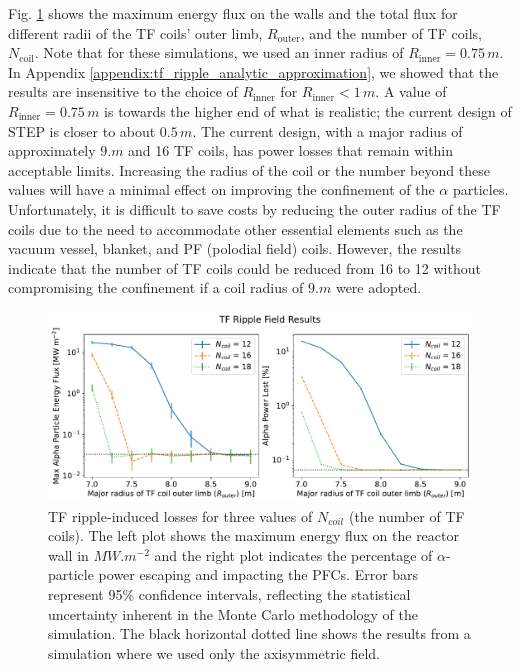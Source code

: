 \documentclass[10pt, a4paper, twoside]{article}
\begin{document}
Fig. \ref{fig:max_and_total_flux_vs_rcoil_and_ncoil} shows the maximum energy flux on the walls and the total flux for different radii of the TF coils' outer limb, $R_\text{outer}$, and the number of TF coils, $N_\text{coil}$. 
Note that for these simulations, we used an inner radius of $R_\text{inner}=0.75\,\si{m}$. In Appendix \ref{appendix:tf_ripple_analytic_approximation}, we showed that the results are insensitive to the choice of $R_\text{inner}$ for $R_\text{inner}<1\,\si{m}$. A value of $R_\text{inner}=0.75\,\si{m}$ is towards the higher end of what is realistic; the current design of STEP is closer to about $0.5\,\si{m}$. 
The current design, with a major radius of approximately $\si{9.m}$ and 16 TF coils, has power losses that remain within acceptable limits. Increasing the radius of the coil or the number beyond these values will have a minimal effect on improving the confinement of the $\alpha$ particles. 
Unfortunately, it is difficult to save costs by reducing the outer radius of the TF coils due to the need to accommodate other essential elements such as the vacuum vessel, blanket, and PF (polodial field) coils. However, the results indicate that the number of TF coils could be reduced from 16 to 12 without compromising the confinement if a coil radius of $\si{9.m}$ were adopted.

\begin{figure}[htpb]
    \centering
    \vspace{1cm}
    \includegraphics[width=0.99\linewidth]{Figures/max_and_total_flux_vs_rcoil.pdf}
    \caption{TF ripple-induced losses for three values of $N_{coil}$ (the number of TF coils). The left plot shows the maximum energy flux on the reactor wall in $\si{MW.m^{-2}}$ and the right plot indicates the percentage of $\alpha$-particle power escaping and impacting the PFCs. Error bars represent 95\% confidence intervals, reflecting the statistical uncertainty inherent in the Monte Carlo methodology of the simulation. The black horizontal dotted line shows the results from a simulation where we used only the axisymmetric field.}
    \label{fig:max_and_total_flux_vs_rcoil_and_ncoil}
\end{figure}
\end{document}
